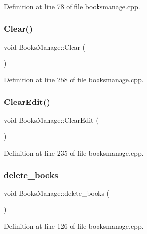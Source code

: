 Definition at line 78 of file booksmanage.\+cpp.

\mbox{\label{class_books_manage_a8388b6b8547cc759a9976c1a567aab0a}} 
\subsubsection{\texorpdfstring{Clear()}{Clear()}}
{\footnotesize\ttfamily void Books\+Manage\+::\+Clear (\begin{DoxyParamCaption}{ }\end{DoxyParamCaption})}



Definition at line 258 of file booksmanage.\+cpp.

\mbox{\label{class_books_manage_aa5b813a7fb68aa61a143f84c87699c83}} 
\subsubsection{\texorpdfstring{ClearEdit()}{ClearEdit()}}
{\footnotesize\ttfamily void Books\+Manage\+::\+Clear\+Edit (\begin{DoxyParamCaption}{ }\end{DoxyParamCaption})}



Definition at line 235 of file booksmanage.\+cpp.

\mbox{\label{class_books_manage_ae8adc7f70a2e95f5a5991137e11a18ae}} 
\subsubsection{\texorpdfstring{delete\_books}{delete\_books}}
{\footnotesize\ttfamily void Books\+Manage\+::delete\+\_\+books (\begin{DoxyParamCaption}{ }\end{DoxyParamCaption})\hspace{0.3cm}{\ttfamily [slot]}}



Definition at line 126 of file booksmanage.\+cpp.

